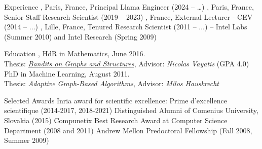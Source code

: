 \documentclass{resume}
\begin{document}
\begin{small}\maketitle\end{small}







\vspace{-2.3em}
\begin{category}{Experience}
\setlength\itemsep{0.2em}
, Paris, France, 
Principal Llama Engineer (2024 -- \dots) 
, Paris, France,
Senior Staff Research Scientist (2019 -- 2023) 
, France, 
External Lecturer - CEV (2014 -- $\dots$)
, Lille, France,
Tenured Research Scientist (2011 -- $\dots$) 
 -- Intel Labs (Summer 2010) and Intel Research 
(Spring 2009)
\end{category}
\vspace{-0.5cm}
\begin{category}{Education}
\setlength\itemsep{0.15em}
, HdR in Mathematics, June 2016.\\
Thesis: \href{http://researchers.lille.inria.fr/~valko/hp/publications/valko2016bandits.pdf}{\emph{Bandits on Graphs and Structures}}, Advisor: \emph{Nicolas Vayatis}
 (GPA 4.0)
PhD in Machine Learning, August 2011. \\ Thesis: \emph{Adaptive Graph-Based Algorithms}, Advisor: \emph{Milos Hauskrecht}
\end{category}
\vspace{-0.5cm}
\begin{category}{Selected Awards}
\setlength\itemsep{0.1em}
	\citemnobullet Inria award for scientific excellence:
Prime d'excellence scientifique (2014-2017, 2018-2021)
\citemnobullet Distinguished Alumni of Comenius University, Slovakia (2015)
	\citemnobullet Compunetix Best Research Award at Computer Science 
Department (2008 
and 2011)	
       \citemnobullet Andrew Mellon Predoctoral Fellowship (Fall 2008, Summer 
2009)	
\end{category}
\end{document}
